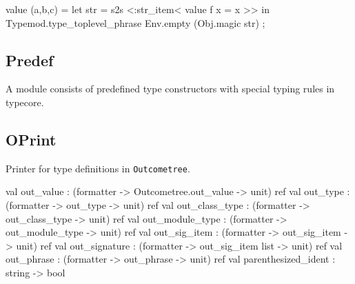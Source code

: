 \begin{ocamlcode}
value (a,b,c) = 
  let str = s2s <:str_item< value f x = x  >> in
  Typemod.type_toplevel_phrase Env.empty (Obj.magic str) ;
\end{ocamlcode}




\subsection{Predef}

A module consists of predefined type constructors with special typing
rules in typecore.
\subsection{OPrint}
Printer for type definitions in \verb|Outcometree|.

\begin{ocamlcode}
val out_value : (formatter -> Outcometree.out_value -> unit) ref
val out_type : (formatter -> out_type -> unit) ref
val out_class_type : (formatter -> out_class_type -> unit) ref
val out_module_type : (formatter -> out_module_type -> unit) ref
val out_sig_item : (formatter -> out_sig_item -> unit) ref
val out_signature : (formatter -> out_sig_item list -> unit) ref
val out_phrase : (formatter -> out_phrase -> unit) ref
val parenthesized_ident : string -> bool
\end{ocamlcode}
